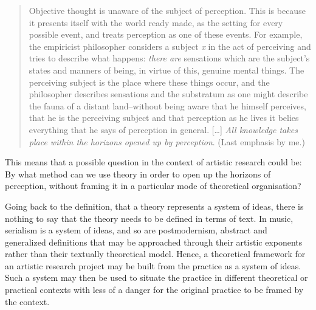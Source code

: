 \documentclass[12pt]{article}
\begin{document}

\begin{quotation}
  Objective thought is unaware of the subject of perception. This is
  because it presents itself with the world ready made, as the setting
  for every possible event, and treats perception as one of these
  events. For example, the empiricist philosopher considers a subject
  \emph{x} in the act of perceiving and tries to describe what
  happens: \emph{there are} sensations which are the subject's states
  and manners of being, in virtue of this, genuine mental things. The
  perceiving subject is the place where these things occur, and the
  philosopher describes sensations and the substratum as one might
  describe the fauna of a distant land--without being aware that he
  himself perceives, that he is the perceiving subject and that
  perception as he lives it belies everything that he says of
  perception in general. [\ldots] \emph{All knowledge takes place
    within the horizons opened up by perception}. (Last emphasis by me.)
\end{quotation} 
This means that a possible question in the context of artistic research could be: By what method can we use theory in order to open up the horizons of perception, without framing it in a particular mode of theoretical organisation? 


Going back to the definition, that a theory represents a system of ideas, there is nothing to say that the theory needs to be defined in terms of text. In music, serialism is a system of ideas, and so are postmodernism, abstract and generalized definitions that may be approached through their artistic exponents rather than their textually theoretical model. Hence, a theoretical framework for an artistic research project may be built from the practice as a system of ideas. Such a system may then be used to situate the practice in different theoretical or practical contexts with less of a danger for the original practice to be framed by the context.
\end{document}
